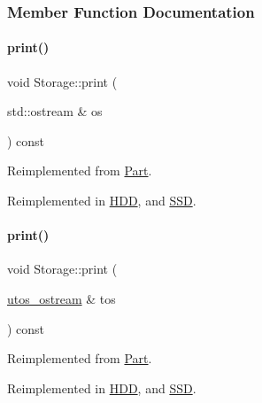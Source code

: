 \subsubsection{Member Function Documentation}
\mbox{\label{class_storage_aa9f6ffb0fd45839b54bd4e254270445d}} 
\paragraph{\texorpdfstring{print()}{print()}\hspace{0.1cm}{\footnotesize\ttfamily [1/4]}}
{\footnotesize\ttfamily void Storage\+::print (\begin{DoxyParamCaption}\item[{std\+::ostream \&}]{os }\end{DoxyParamCaption}) const\hspace{0.3cm}{\ttfamily [virtual]}}



Reimplemented from \mbox{\hyperlink{class_part_a4fa402b8e8fd4236ff773a7697ab2bc3}{Part}}.



Reimplemented in \mbox{\hyperlink{class_h_d_d_a07c34356018542934a4dd91ce38b0821}{H\+DD}}, and \mbox{\hyperlink{class_s_s_d_a3c07aa0fd7bb547cfb4a775513e427a9}{S\+SD}}.

\mbox{\label{class_storage_ab7ecf9e0777891b4e1a84bbf391a1cd4}} 
\paragraph{\texorpdfstring{print()}{print()}\hspace{0.1cm}{\footnotesize\ttfamily [2/4]}}
{\footnotesize\ttfamily void Storage\+::print (\begin{DoxyParamCaption}\item[{\mbox{\hyperlink{structutos__ostream}{utos\+\_\+ostream}} \&}]{tos }\end{DoxyParamCaption}) const\hspace{0.3cm}{\ttfamily [virtual]}}



Reimplemented from \mbox{\hyperlink{class_part_a9ecabe44ba3415badf82c6a23617a41e}{Part}}.



Reimplemented in \mbox{\hyperlink{class_h_d_d_aca2c2583fa3304917905cd9185b64539}{H\+DD}}, and \mbox{\hyperlink{class_s_s_d_ab07086e302f8be99cfa757583d2017a0}{S\+SD}}.

